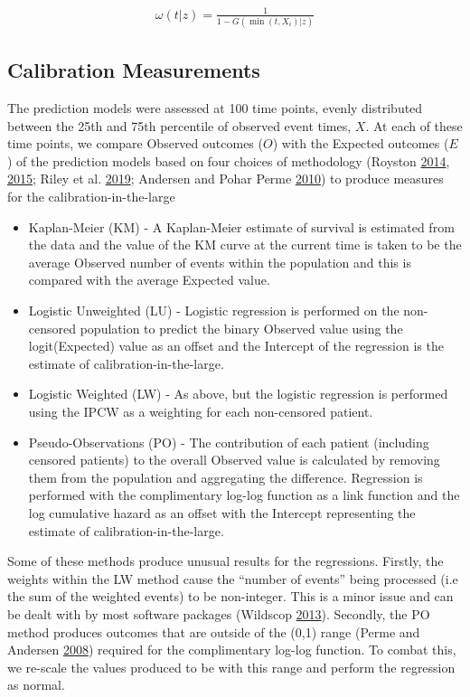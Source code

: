 \documentclass[
]{article}
\providecommand{\tightlist}{%
  \setlength{\itemsep}{0pt}\setlength{\parskip}{0pt}}
\begin{document}
\[
\begin{array}{c}
\omega(t|z) = \frac{1}{1 - G(\min(t,X_i)|z)}
\end{array}
\]

\hypertarget{calibration-measurements}{%
\subsection{Calibration Measurements}\label{calibration-measurements}}

The prediction models were assessed at 100 time points, evenly distributed between the 25th and 75th percentile of observed event times, \(X\). At each of these time points, we compare Observed outcomes (\(O\)) with the Expected outcomes (\(E\)) of the prediction models based on four choices of methodology (Royston \protect\hyperlink{ref-royston_tools_2014}{2014}, \protect\hyperlink{ref-royston_tools_2015}{2015}; Riley et al. \protect\hyperlink{ref-riley_prognosis_2019}{2019}; Andersen and Pohar Perme \protect\hyperlink{ref-andersen_pseudo-observations_2010}{2010}) to produce measures for the calibration-in-the-large
\begin{itemize}
\tightlist
\item
  Kaplan-Meier (KM) - A Kaplan-Meier estimate of survival is estimated from the data and the value of the KM curve at the current time is taken to be the average Observed number of events within the population and this is compared with the average Expected value.
\item
  Logistic Unweighted (LU) - Logistic regression is performed on the non-censored population to predict the binary Observed value using the logit(Expected) value as an offset and the Intercept of the regression is the estimate of calibration-in-the-large.
\item
  Logistic Weighted (LW) - As above, but the logistic regression is performed using the IPCW as a weighting for each non-censored patient.
\item
  Pseudo-Observations (PO) - The contribution of each patient (including censored patients) to the overall Observed value is calculated by removing them from the population and aggregating the difference. Regression is performed with the complimentary log-log function as a link function and the log cumulative hazard as an offset with the Intercept representing the estimate of calibration-in-the-large.
\end{itemize}
Some of these methods produce unusual results for the regressions. Firstly, the weights within the LW method cause the ``number of events'' being processed (i.e the sum of the weighted events) to be non-integer. This is a minor issue and can be dealt with by most software packages (Wildscop \protect\hyperlink{ref-wildscop_biostatistics_2013}{2013}). Secondly, the PO method produces outcomes that are outside of the (0,1) range (Perme and Andersen \protect\hyperlink{ref-perme_checking_2008}{2008}) required for the complimentary log-log function. To combat this, we re-scale the values produced to be with this range and perform the regression as normal.
\end{document}
